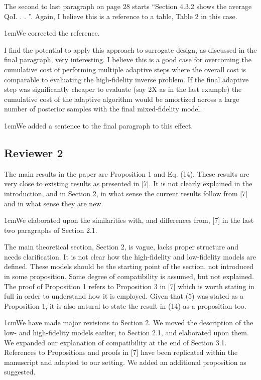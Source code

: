 \documentclass[12pt, letterpaper]{article}
\newcommand{\answer}[1]{\begin{adjustwidth}{1cm}{}{\color{blue}#1}\end{adjustwidth}}
\begin{document}
The second to last paragraph on page 28 starts “Section 4.3.2 shows the average QoI. . . ”. Again, I
believe this is a reference to a table, Table 2 in this case.

\answer{We corrected the reference.}

I find the potential to apply this approach to surrogate design, as discussed in the final paragraph, very
interesting. I believe this is a good case for overcoming the cumulative cost of performing multiple
adaptive steps where the overall cost is comparable to evaluating the high-fidelity inverse problem.
If the final adaptive step was significantly cheaper to evaluate (say 2X as in the last example) the
cumulative cost of the adaptive algorithm would be amortized across a large number of posterior
samples with the final mixed-fidelity model.

\answer{We added a sentence to the final paragraph to this effect.}


\subsection*{Reviewer 2}

The main results in the paper are Proposition 1 and Eq. (14). These results are very close to existing results as presented in [7]. It is not clearly explained in the introduction, and in Section 2, in what sense the current results follow from [7] and in what sense they are new.

\answer{We elaborated upon the similarities with, and differences from, [7] in the last two paragraphs of Section 2.1.}

The main theoretical section, Section 2, is vague, lacks proper structure and needs clarification. It is not clear how the high-fidelity and low-fidelity models are defined. These models should be the starting point of the section, not introduced in some proposition. Some degree of compatibility is assumed, but not explained. The proof of Proposition 1 refers to Proposition 3 in [7] which is worth stating in full in order to understand how it is employed. Given that (5) was stated as a Proposition 1, it is also natural to state the result in (14) as a proposition too.

\answer{We have made major revisions to Section 2. We moved the description of the low- and high-fidelity models earlier, to Section 2.1, and elaborated upon them. We expanded our explanation of compatibility at the end of Section 3.1. References to Propositions and proofs in [7] have been replicated within the manuscript and adapted to our setting. We added an additional proposition as suggested.}
\end{document}
